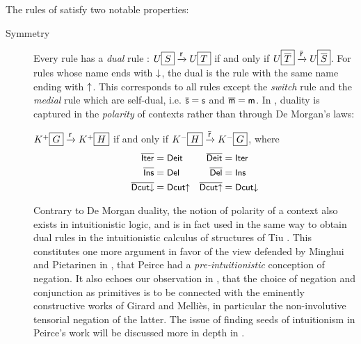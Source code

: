 The rules of  satisfy two notable properties:
\begin{description}
  \item[Symmetry] 
    Every rule  has a \emph{dual} rule : $U\fbox{$S$}
    \xrightarrow{\text{\small$\mathsf{r}$}} U\fbox{$T$}$ if and only if $U\fbox{$\overline{T}$}
    \xrightarrow{\text{\small$\mathsf{\overline{r}}$}} U\fbox{$\overline{S}$}$. For rules whose name ends
    with $\downarrow$, the dual is the rule with the same name ending with
    $\uparrow$. This corresponds to all rules except the \emph{switch} rule
     and the \emph{medial} rule  which are self-dual, i.e.
    $\overline{\text{\small$\mathsf{s}$}} = \text{\small$\mathsf{s}$}$ and $\overline{\text{\small$\mathsf{m}$}} = \text{\small$\mathsf{m}$}$. In
    , duality is captured in the \emph{polarity} of contexts rather
    than through De Morgan's laws:
    
    \begin{fact}[Duality]
      $K^+\fbox{$G$} \xrightarrow{\text{\small$\mathsf{r}$}} K^+\fbox{$H$}$
      if and only if $K^-\fbox{$H$} \xrightarrow{\text{\small$\mathsf{\overline{r}}$}} K^-\fbox{$G$}$, where
      \begin{align*}
        \overline{\text{\small$\mathsf{Iter}$}} &= \text{\small$\mathsf{Deit}$} & \overline{\text{\small$\mathsf{Deit}$}} &= \text{\small$\mathsf{Iter}$} \\
        \overline{\text{\small$\mathsf{Ins}$}} &= \text{\small$\mathsf{Del}$} & \overline{\text{\small$\mathsf{Del}$}} &= \text{\small$\mathsf{Ins}$} \\
        \overline{\text{\small$\mathsf{Dcut{\downarrow}}$}} &= \text{\small$\mathsf{Dcut{\uparrow}}$} & \overline{\text{\small$\mathsf{Dcut{\uparrow}}$}} &= \text{\small$\mathsf{Dcut{\downarrow}}$}
      \end{align*}
    \end{fact}

    \begin{remark}
      
    Contrary to De Morgan duality, the notion of polarity of a context also
    exists in intuitionistic logic, and is in fact used in the same way to
    obtain dual rules in the intuitionistic calculus of structures  of
    Tiu \cite{tiu_local_2006}. This constitutes one more argument in favor of
    the view defended by Minghui and Pietarinen in
    , that Peirce had a
    \emph{pre-intuitionistic} conception of negation. It also echoes our
    observation in , that the choice of negation and
    conjunction as primitives is to be connected with the eminently constructive
    works of Girard and Melliès, in particular the non-involutive tensorial
    negation of the latter. The issue of finding seeds of intuitionism in
    Peirce's work will be discussed more in depth in .
    \end{remark}


\end{description}
